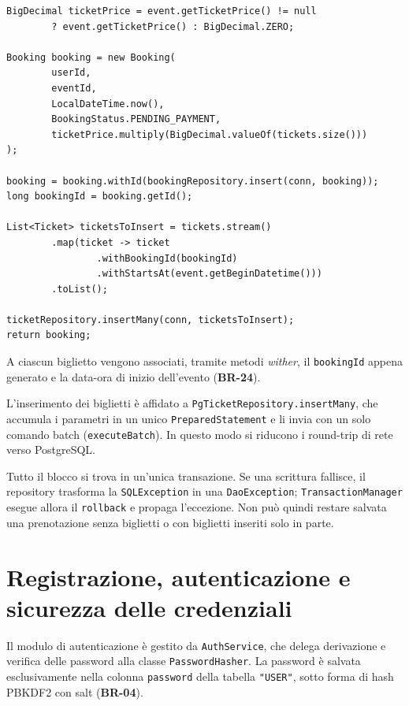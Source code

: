 \begin{lstlisting}[caption={Creazione della prenotazione e inserimento in batch dei biglietti nominativi.}, label={lst:booking-insert}]
BigDecimal ticketPrice = event.getTicketPrice() != null
        ? event.getTicketPrice() : BigDecimal.ZERO;

Booking booking = new Booking(
        userId,
        eventId,
        LocalDateTime.now(),
        BookingStatus.PENDING_PAYMENT,
        ticketPrice.multiply(BigDecimal.valueOf(tickets.size()))
);

booking = booking.withId(bookingRepository.insert(conn, booking));
long bookingId = booking.getId();

List<Ticket> ticketsToInsert = tickets.stream()
        .map(ticket -> ticket
                .withBookingId(bookingId)
                .withStartsAt(event.getBeginDatetime()))
        .toList();

ticketRepository.insertMany(conn, ticketsToInsert);
return booking;
\end{lstlisting}

A ciascun biglietto vengono associati, tramite metodi \textit{wither}, il \texttt{bookingId} appena generato e la data-ora di inizio dell'evento (\textbf{BR-24}).

L'inserimento dei biglietti è affidato a \texttt{PgTicketRepository.insertMany}, che accumula i parametri in un unico \texttt{PreparedStatement} e li invia con un solo comando batch (\texttt{executeBatch}). In questo modo si riducono i round-trip di rete verso PostgreSQL.

Tutto il blocco si trova in un'unica transazione. Se una scrittura fallisce, il repository trasforma la \texttt{SQLException} in una \texttt{DaoException}; \texttt{TransactionManager} esegue allora il \texttt{rollback} e propaga l'eccezione. Non può quindi restare salvata una prenotazione senza biglietti o con biglietti inseriti solo in parte.

\section{Registrazione, autenticazione e sicurezza delle credenziali}
\label{sec:autenticazione-sicurezza}

Il modulo di autenticazione è gestito da \texttt{AuthService}, che delega derivazione e verifica delle password alla classe \texttt{PasswordHasher}. La password è salvata esclusivamente nella colonna \texttt{password} della tabella \texttt{"USER"}, sotto forma di hash PBKDF2 con salt (\textbf{BR-04}).

